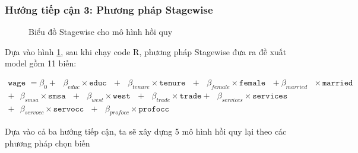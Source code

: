 \subsubsection*{Hướng tiếp cận 3: Phương pháp Stagewise}
\begin{figure}[H]
	\centering
	 \hfill
	\caption{Biểu đồ Stagewise cho mô hình hồi quy}
	\label{stagewise}
\end{figure}

Dựa vào hình \ref{stagewise}, sau khi chạy code R, phương pháp Stagewise đưa ra đề xuất model gồm 11 biến:

\begin{equation*}
	\begin{multlined}
		\texttt{wage } = \beta_0 + \text{ } \beta_{educ}\times \texttt{educ} \text{ } + \text{ } \beta_{tenure} \times \texttt{tenure} \text{ }+\text{ }\beta_{female} \times \texttt{female} \text{ } 
		+ \beta_{married} \text{ } \times \texttt{married} \text{ } \\
		+\text{ }\beta_{smsa} \times\texttt{smsa}\text{ }  
		+ \text{ }\beta_{west} \times \texttt{west} \text{ } 
		+ \text{ }\beta_{trade}\times \texttt{trade} + \text{ }\beta_{services} \times \texttt{services} \text{ } \\
		+ \text{ }\beta_{servocc} \times \texttt{servocc} \text{ } + \text{ }\beta_{profocc}\times \texttt{profocc}
	\end{multlined}
\end{equation*}

Dựa vào cả ba hướng tiếp cận, ta sẽ xây dựng 5 mô hình hồi quy lại theo các phương pháp chọn biến

